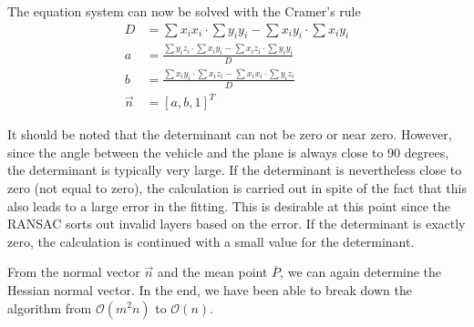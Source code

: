 \documentclass[11pt,oneside,openright]{mpreport}
\begin{document}
The equation system can now be solved with the Cramer's rule
\begin{align*}
D &= \sum x_i x_i \cdot \sum y_i y_i - \sum x_i y_i \cdot \sum x_i y_i \\
a &= \frac{\sum y_i z_i \cdot \sum x_i y_i - \sum x_i z_i \cdot \sum y_i y_i }{D}\\
b &= \frac{\sum x_i y_i \cdot \sum x_i z_i - \sum x_i x_i \cdot \sum y_i z_i }{D}\\
\vec{n} &= [a, b, 1]^T
\end{align*}

It should be noted that the determinant can not be zero or near zero. However, since the angle between the vehicle and the plane is always close to 90 degrees,
the determinant is typically very large. If the determinant is nevertheless close to zero (not equal to zero), the calculation is carried out in spite of the fact that
this also leads to a large error in the fitting. This is desirable at this point since the \ac{RANSAC} sorts out invalid layers based on the error.
If the determinant is exactly zero, the calculation is continued with a small value for the determinant.

% 

From the normal vector $\vec{n}$ and the mean point $\overline{P}$, we can again determine the Hessian normal vector.
In the end, we have been able to break down the algorithm from $\mathcal{O}(m^2n)$ to $\mathcal{O}(n)$.
\end{document}
